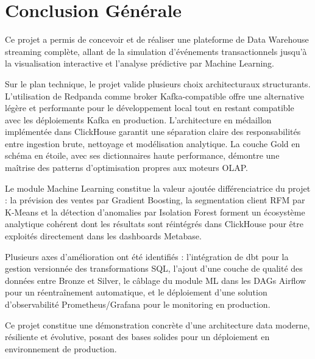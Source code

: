 \documentclass{rapportENSIAS}
\begin{document}
\newpage
\tabledematieres






\newpage
\chapter*{Conclusion Générale}
\vspace{3cm}

Ce projet a permis de concevoir et de réaliser une plateforme de Data Warehouse streaming complète, allant de la simulation d'événements transactionnels jusqu'à la visualisation interactive et l'analyse prédictive par Machine Learning.

Sur le plan technique, le projet valide plusieurs choix architecturaux structurants. L'utilisation de Redpanda comme broker Kafka-compatible offre une alternative légère et performante pour le développement local tout en restant compatible avec les déploiements Kafka en production. L'architecture en médaillon implémentée dans ClickHouse garantit une séparation claire des responsabilités entre ingestion brute, nettoyage et modélisation analytique. La couche Gold en schéma en étoile, avec ses dictionnaires haute performance, démontre une maîtrise des patterns d'optimisation propres aux moteurs OLAP.

Le module Machine Learning constitue la valeur ajoutée différenciatrice du projet : la prévision des ventes par Gradient Boosting, la segmentation client RFM par K-Means et la détection d'anomalies par Isolation Forest forment un écosystème analytique cohérent dont les résultats sont réintégrés dans ClickHouse pour être exploités directement dans les dashboards Metabase.

Plusieurs axes d'amélioration ont été identifiés : l'intégration de dbt pour la gestion versionnée des transformations SQL, l'ajout d'une couche de qualité des données entre Bronze et Silver, le câblage du module ML dans les DAGs Airflow pour un réentraînement automatique, et le déploiement d'une solution d'observabilité Prometheus/Grafana pour le monitoring en production.

Ce projet constitue une démonstration concrète d'une architecture data moderne, résiliente et évolutive, posant des bases solides pour un déploiement en environnement de production.
\end{document}
